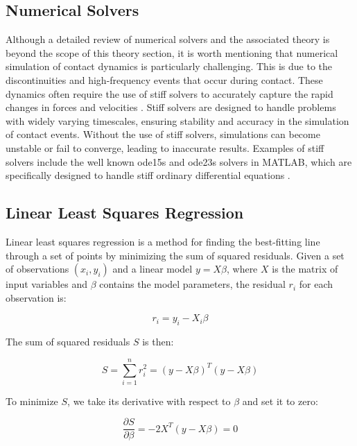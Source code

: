 \subsection{Numerical Solvers}
\label{sec:numerical_solvers}

Although a detailed review of numerical solvers and the associated theory is beyond the scope of this theory section, it is worth mentioning that numerical simulation of contact dynamics is particularly challenging. This is due to the discontinuities and high-frequency events that occur during contact. These dynamics often require the use of stiff solvers to accurately capture the rapid changes in forces and velocities \cite{stiff_contact_ODE_1}\cite{stiff_contact_ODE_2}. Stiff solvers are designed to handle problems with widely varying timescales, ensuring stability and accuracy in the simulation of contact events. Without the use of stiff solvers, simulations can become unstable or fail to converge, leading to inaccurate results. Examples of stiff solvers include the well known ode15s and ode23s solvers in MATLAB, which are specifically designed to handle stiff ordinary differential equations \cite{MATLAB_ODE}. 


\subsection{Linear Least Squares Regression}
Linear least squares regression is a method for finding the best-fitting line through a set of points by minimizing the sum of squared residuals. Given a set of observations \((x_i, y_i)\) and a linear model \(y = X\beta\), where \(X\) is the matrix of input variables and \(\beta\) contains the model parameters, the residual \(r_i\) for each observation is:

\begin{equation}
\label{eq:residual}
r_i = y_i - X_i\beta
\end{equation}

The sum of squared residuals \(S\) is then:

\begin{equation}
\label{eq:sum_squared_residuals} 
S = \sum_{i=1}^n r_i^2 = (y - X\beta)^T(y - X\beta)
\end{equation}

To minimize \(S\), we take its derivative with respect to \(\beta\) and set it to zero:

\begin{equation}
\label{eq:derivative_residuals}
\frac{\partial S}{\partial \beta} = -2X^T(y - X\beta) = 0
\end{equation}

